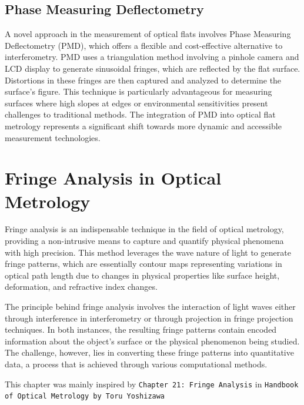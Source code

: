 \documentclass[../main.tex]{subfiles}
\begin{document}
\subsection{Phase Measuring Deflectometry}
\vspace{-15pt}
A novel approach in the measurement of optical flats involves Phase Measuring Deflectometry (PMD), which offers a flexible and cost-effective alternative to interferometry. PMD uses a triangulation method involving a pinhole camera and LCD display to generate sinusoidal fringes, which are reflected by the flat surface. Distortions in these fringes are then captured and analyzed to determine the surface's figure. This technique is particularly advantageous for measuring surfaces where high slopes at edges or environmental sensitivities present challenges to traditional methods. The integration of PMD into optical flat metrology represents a significant shift towards more dynamic and accessible measurement technologies.\cite{WOS:000385319500019}
\vspace{-15pt}
\section{Fringe Analysis in Optical Metrology}
\vspace{-15pt}
Fringe analysis is an indispensable technique in the field of optical metrology, providing a non-intrusive means to capture and quantify physical phenomena with high precision. This method leverages the wave nature of light to generate fringe patterns, which are essentially contour maps representing variations in optical path length due to changes in physical properties like surface height, deformation, and refractive index changes.

The principle behind fringe analysis involves the interaction of light waves either through interference in interferometry or through projection in fringe projection techniques. In both instances, the resulting fringe patterns contain encoded information about the object's surface or the physical phenomenon being studied. The challenge, however, lies in converting these fringe patterns into quantitative data, a process that is achieved through various computational methods.

This chapter was mainly inspired by \texttt{Chapter 21: Fringe Analysis} in \texttt{Handbook of Optical Metrology by Toru Yoshizawa}\cite{fringe_analysis}
\vspace{-15pt}
\end{document}
